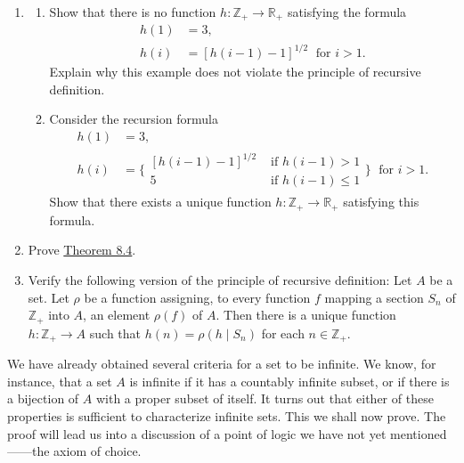 \begin{enumerate}[itemsep=0.4em, parsep=0pt, topsep=0pt, partopsep=0pt, leftmargin=*, label=\arabic*., ref=\arabic*]
\item
  \begin{enumerate}[itemsep=0.2em, parsep=0pt, topsep=0pt, partopsep=0pt, leftmargin=*, label=(\alph*), align=left]
  \item Show that there is no function \(h : \mathbb{Z}_{+} \rightarrow {\mathbb{R}}_{+}\) satisfying the formula \[ \begin{aligned} h(1) &= 3, \\ h(i) &= {[ h( i - 1) - 1] }^{1/2}\;\text{ for }i > 1. \end{aligned} \] Explain why this example does not violate the principle of recursive definition.
  \item Consider the recursion formula \[ \begin{aligned} h(1) &= 3, \\ h(i) &= \{ \begin{array}{ll} {[ h( i - 1) - 1] }^{1/2} & \text{ if }h({i - 1}) > 1 \\ 5 & \text{ if }h({i - 1}) \leq 1 \end{array}\} \;\text{ for }i > 1. \end{aligned} \] Show that there exists a unique function \(h : \mathbb{Z}_{+} \rightarrow {\mathbb{R}}_{+}\) satisfying this formula.
  \end{enumerate}
\item Prove \hyperref[thm:8.4]{Theorem 8.4}.
\item Verify the following version of the principle of recursive definition: Let \(A\) be a set. Let \(\rho\) be a function assigning, to every function \(f\) mapping a section \(S_{n}\) of \(\mathbb{Z}_{+}\) into \(A\), an element \(\rho ( f)\) of \(A\). Then there is a unique function \(h : \mathbb{Z}_{+} \rightarrow A\) such that \(h(n) = \rho ({h \mid {S}_{n}})\) for each \(n \in {\mathbb{Z}}_{+}\).
\end{enumerate}


We have already obtained several criteria for a set to be infinite. 
We know, for instance, that a set \(A\) is infinite if it has a countably infinite subset, 
or if there is a bijection of \(A\) with a proper subset of itself. 
It turns out that either of these properties is sufficient to characterize infinite sets. 
This we shall now prove. The proof will lead us into a discussion of a point of 
logic we have not yet mentioned——the axiom of choice.

